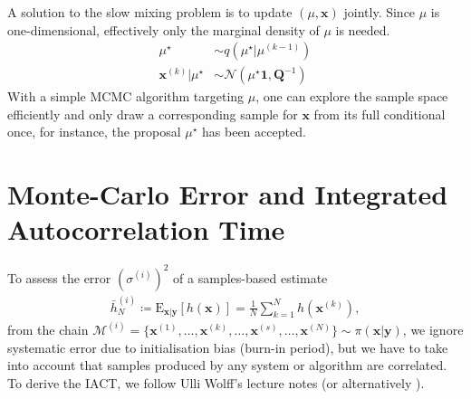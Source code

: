 A solution to the slow mixing problem is to update $(\mu, \bm{x})$ jointly.
Since $\mu$ is one-dimensional, effectively only the marginal density of $\mu$ is needed.
\begin{align}
	\mu^{\star}  &\sim q (\mu^{\star}|	\mu^{(k-1)} ) \\
	\bm{x}^{(k)} | \mu^{\star} &\sim \mathcal{N} (	\mu^{\star}\bm{1}, \bm{Q}^{-1}) 
\end{align}
With a simple MCMC algorithm targeting $ \mu$, one can explore the sample space efficiently and only draw a corresponding sample for $\bm{x}$ from its full conditional once, for instance, the proposal $\mu^{\star}$ has been accepted.

\section{Monte-Carlo Error and Integrated Autocorrelation Time}
\label{ap:IATC}
To assess the error $(\sigma^{(i)})^2$ of a samples-based estimate 
\begin{align}
\bar{h}_N^{(i)} \coloneqq	\text{E}_{\bm{x}|\bm{y}} [h(\bm{x})] = \frac{1}{N} \sum_{k=1}^{N} h(\bm{x}^{(k)}),
\end{align} 
from the chain $\mathcal{M}^{(i)} = \{\bm{x}^{(1)}, \dots,\bm{x}^{(k)},\dots, \bm{x}^{(s)},\dots, \bm{x}^{(N)}\} \sim \pi(\bm{x}|\bm{y})$, we ignore systematic error due to initialisation bias (burn-in period), but we have to take into account that samples produced by any system or algorithm are correlated.
To derive the IACT, we follow Ulli Wolff's lecture notes \cite{wolff2002LecNot} (or alternatively \cite{wolff2004monte}).

